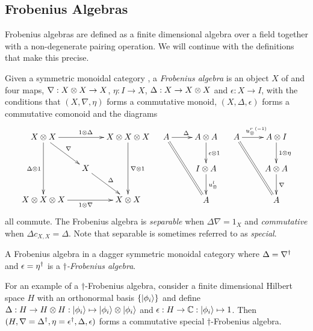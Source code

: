 \subsection{Frobenius Algebras} %
\label{sub:frobenius_algebras}
Frobenius algebras are defined as a finite dimensional algebra over a field together with a
non-degenerate pairing operation. We will continue with the definitions that make this precise.

\begin{definition}\label{def:frobeniusalgebra}
  Given a symmetric monoidal category \cD, a \emph{Frobenius algebra} is an object $X$ of \cD and
  four maps, $\nabla :X\otimes X \to X$, $\eta: I \to X$, $\Delta: X\to X\otimes X$ and $\epsilon:X\to I$, with
  the conditions that $(X,\nabla,\eta)$ forms a commutative monoid, $(X,\Delta, \epsilon)$ forms a
  commutative comonoid and the diagrams
  \[
    \xymatrix@C-10pt{
      X\*X \ar[rr]^{1\*\Delta} \ar[dd]_{\Delta \* 1} \ar[dr]^{\nabla}
        && X\*X\*X \ar[dd]^{\nabla\*1}\\
      & X\ar[dr]^{\Delta}\\
      X\*X\*X\ar[rr]_{1\*\nabla}  && X\*X
    }\quad
    \xymatrix{
      A \ar[r]^{\Delta} \ar@{=}[ddr] & A\*A \ar[d]^{\epsilon\*1} \\
      & I\*A \ar[d]^{\usl}\\
      & A
    }\quad
    \xymatrix{
      A \ar[r]^{\inv{\usr}} \ar@{=}[ddr] & A\*I \ar[d]^{1\*\eta}\\
      & A\*A \ar[d]^{\nabla} \\
      & A
    }
  \]
  all commute. The Frobenius algebra is \emph{separable} when $\Delta \nabla = 1_{X}$ and
  \emph{commutative} when $\Delta c_{X,X} = \Delta$. Note that separable is sometimes referred to as
  \emph{special}.
\end{definition}
\begin{definition}\label{def:daggerfrob}
  A Frobenius algebra in a dagger symmetric monoidal category where $\Delta = {\nabla}^{\dagger}$ and
  $\epsilon={\eta}^{\dagger}$ is a $\dagger$\emph{-Frobenius algebra}.
\end{definition}
For an example of a $\dagger$-Frobenius algebra, consider a finite dimensional Hilbert space $H$
with an orthonormal basis $\{\left\vert{\phi_{i}}\right\rangle\}$ and define $\Delta:H\to H\otimes H: \left\vert{\phi_{i}}\right\rangle\mapsto
\left\vert{\phi_{i}}\right\rangle \otimes \left\vert{\phi_{i}}\right\rangle$ and $\epsilon : H\to \mathbb{C} : \left\vert{\phi_{i}}\right\rangle \mapsto 1$. Then $(H,
\nabla={\Delta}^{\dagger}, \eta={\epsilon}^{\dagger}, \Delta, \epsilon)$ forms a commutative special
$\dagger$-Frobenius algebra.


